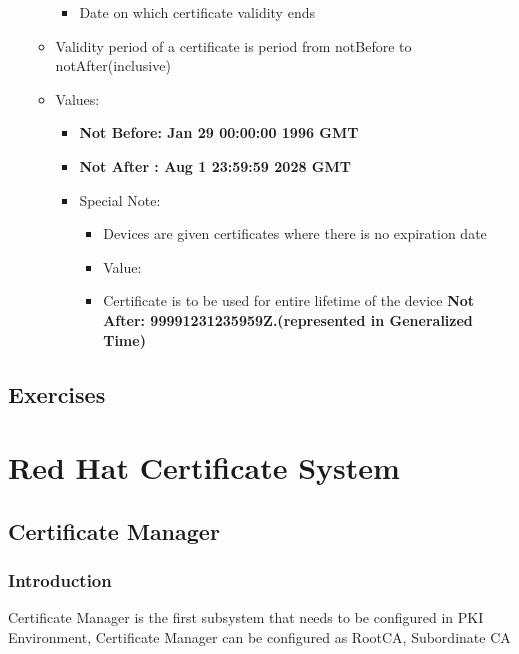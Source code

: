 \documentclass[a4paper]{article}
\begin{document}
\begin{itemize}
\begin{itemize}
\begin{itemize}
                            \item Date on which certificate validity ends
                        \end{itemize}
                    \item Validity period of a certificate is period from notBefore to notAfter(inclusive)
                    \item Values:
                        \begin{itemize}
                            \item \textbf{Not Before: Jan 29 00:00:00 1996 GMT}
                            \item \textbf{Not After : Aug  1 23:59:59 2028 GMT}
                            \item Special Note:
                                \begin{itemize}
                                    \item Devices are given certificates where there is no expiration date
                                    \item Value:
                                    \item Certificate is to be used for entire lifetime of the device \textbf{ Not After: 99991231235959Z.(represented in Generalized Time)}
                                \end{itemize}
                        \end{itemize}
                    \end{itemize}
        \end{itemize}
\subsection{Exercises}
\section{Red Hat Certificate System}
\subsection{Certificate Manager}
\subsubsection{Introduction}
Certificate Manager is the first subsystem that needs to be configured in PKI Environment, Certificate Manager can be configured as RootCA, Subordinate CA
\end{document}

